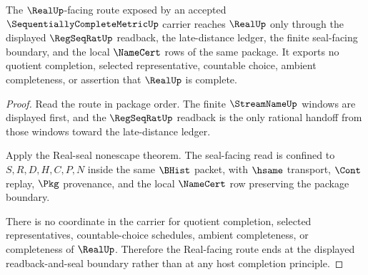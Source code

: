 \begin{theorem}
\label{thm:sequentially-complete-metric-real-route-boundary}
The $\RealUp$-facing route exposed by an accepted $\SequentiallyCompleteMetricUp$ carrier reaches $\RealUp$ only through the displayed $\RegSeqRatUp$ readback, the late-distance ledger, the finite seal-facing boundary, and the local $\NameCert$ rows of the same package. It exports no quotient completion, selected representative, countable choice, ambient completeness, or assertion that $\RealUp$ is complete.
\end{theorem}
\begin{proof}
Read the route in package order. The finite $\StreamNameUp$ windows are displayed first, and the $\RegSeqRatUp$ readback is the only rational handoff from those windows toward the late-distance ledger.

Apply the Real-seal nonescape theorem. The seal-facing read is confined to $S,R,D,H,C,P,N$ inside the same $\BHist$ packet, with $\hsame$ transport, $\Cont$ replay, $\Pkg$ provenance, and the local $\NameCert$ row preserving the package boundary.

There is no coordinate in the carrier for quotient completion, selected representatives, countable-choice schedules, ambient completeness, or completeness of $\RealUp$. Therefore the Real-facing route ends at the displayed readback-and-seal boundary rather than at any host completion principle.
\end{proof}

